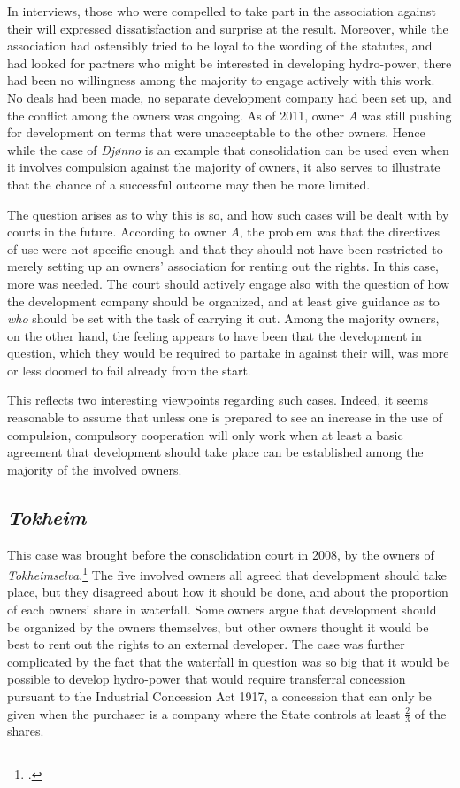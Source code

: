 In interviews, those who were compelled to take part in the association against their will expressed dissatisfaction and surprise at the result. Moreover, while the association had ostensibly tried to be loyal to the wording of the statutes, and had looked for partners who might be interested in developing hydro-power, there had been no willingness among the majority to engage actively with this work. No deals had been made, no separate development company had been set up, and the conflict among the owners was ongoing. As of 2011, owner $A$ was still pushing for development on terms that were unacceptable to the other owners. Hence while the case of \emph{Djønno} is an example that consolidation can be used even when it involves compulsion against the majority of owners, it also serves to illustrate that the chance of a successful outcome may then be more limited.

The question arises as to why this is so, and how such cases will be dealt with by courts in the future. According to owner $A$, the problem was that the directives of use were not specific enough and that they should not have been restricted to merely setting up an owners' association for renting out the rights. In this case, more was needed. The court should actively engage also with the question of how the development company should be organized, and at least give guidance as to \emph{who} should be set with the task of carrying it out. Among the majority owners, on the other hand, the feeling appears to have been that the development in question, which they would be required to partake in against their will, was more or less doomed to fail already from the start.

This reflects two interesting viewpoints regarding such cases. Indeed, it seems reasonable to assume that unless one is prepared to see an increase in the use of compulsion, compulsory cooperation will only work when at least a basic agreement that development should take place can be established among the majority of the involved owners.

\subsection{\emph{Tokheim}}

This case was brought before the consolidation court in 2008, by the owners of \emph{Tokheimselva}.\footcite{tokheim08} The five involved owners all agreed that development should take place, but they disagreed about how it should be done, and about the proportion of each owners' share in waterfall. Some owners argue that development should be organized by the owners themselves, but other owners thought it would be best to rent out the rights to an external developer. The case was further complicated by the fact that the waterfall in question was so big that it would be possible to develop hydro-power that would require transferral concession pursuant to the Industrial Concession Act 1917, a concession that can only be given when the purchaser is a company where the State controls at least $\frac{2}{3}$ of the shares. 

